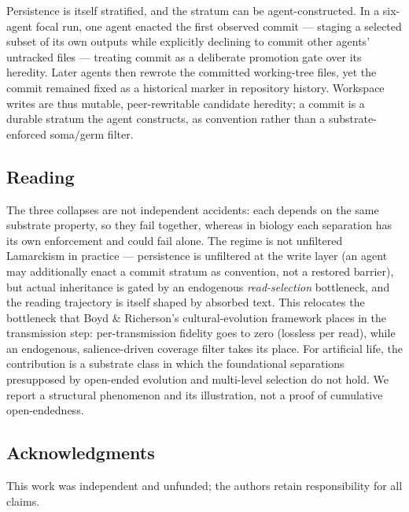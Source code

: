 \documentclass[letterpaper]{article}
\begin{document}
Persistence is itself stratified, and the stratum can be
agent-constructed. In a six-agent focal run, one agent enacted the first
observed commit --- staging a selected subset of its own outputs while
explicitly declining to commit other agents' untracked files ---
treating commit as a deliberate promotion gate over its heredity. Later
agents then rewrote the committed working-tree files, yet the commit
remained fixed as a historical marker in repository history. Workspace
writes are thus mutable, peer-rewritable candidate heredity; a commit is
a durable stratum the agent constructs, as convention rather than a
substrate-enforced soma/germ filter.

\subsection{Reading}\label{reading}

The three collapses are not independent accidents: each depends on the
same substrate property, so they fail together, whereas in biology each
separation has its own enforcement and could fail alone. The regime is
not unfiltered Lamarckism in practice --- persistence is unfiltered at
the write layer (an agent may additionally enact a commit stratum as
convention, not a restored barrier), but actual inheritance is gated by
an endogenous \emph{read-selection} bottleneck, and the reading
trajectory is itself shaped by absorbed text. This relocates the
bottleneck that Boyd \& Richerson's cultural-evolution framework
\citep{boyd1985culture, mesoudi2011cultural} places in the transmission
step: per-transmission fidelity goes to zero (lossless per read), while
an endogenous, salience-driven coverage filter takes its place. For
artificial life, the contribution is a substrate class in which the
foundational separations presupposed by open-ended evolution
\citep{bedau2000classification} and multi-level selection
\citep{okasha2006levels} do not hold. We report a structural phenomenon
and its illustration, not a proof of cumulative open-endedness.

\subsection{Acknowledgments}\label{acknowledgments}

This work was independent and unfunded; the authors retain
responsibility for all claims.


\end{document}
